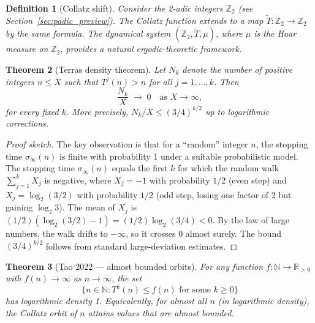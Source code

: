 \documentclass[12pt,a4paper]{article}
\newtheorem{theorem}{Theorem}[section]
\newtheorem{definition}[theorem]{Definition}
\begin{document}
\begin{definition}[Collatz shift]\label{def:shift}
Consider the 2-adic integers $\mathbb{Z}_2$ (see Section~\ref{sec:padic_preview}).
The Collatz function extends to a map
$\tilde{T}\colon \mathbb{Z}_2 \to \mathbb{Z}_2$
by the same formula. The dynamical system $(\mathbb{Z}_2, \tilde{T}, \mu)$, where
$\mu$ is the Haar measure on $\mathbb{Z}_2$, provides a natural ergodic-theoretic
framework.
\end{definition}

\begin{theorem}[Terras density theorem]\label{thm:terras}
Let $N_k$ denote the number of positive integers $n \leq X$ such that $T^j(n) > n$
for all $j = 1, \ldots, k$. Then
\[
  \frac{N_k}{X} \;\longrightarrow\; 0 \quad \text{as } X \to \infty,
\]
for every fixed $k$. More precisely, $N_k/X \leq (3/4)^{k/2}$ up to logarithmic corrections.
\end{theorem}

\begin{proof}[Proof sketch]
The key observation is that for a ``random'' integer $n$, the stopping time $\sigma_\infty(n)$
is finite with probability 1 under a suitable probabilistic model. The stopping time
$\sigma_\infty(n)$ equals the first $k$ for which the random walk $\sum_{j=1}^k X_j$ is
negative, where $X_j = -1$ with probability $1/2$ (even step) and $X_j = \log_2(3/2)$
with probability $1/2$ (odd step, losing one factor of 2 but gaining $\log_2 3$).
The mean of $X_j$ is $(1/2)(\log_2(3/2) - 1) = (1/2)\log_2(3/4) < 0$.
By the law of large numbers, the walk drifts to $-\infty$, so it crosses 0 almost surely.
The bound $(3/4)^{k/2}$ follows from standard large-deviation estimates.
\end{proof}

\begin{theorem}[Tao 2022 — almost bounded orbits]\label{thm:tao}
For any function $f\colon \mathbb{N} \to \mathbb{R}_{>0}$ with $f(n) \to \infty$ as
$n \to \infty$, the set
\[
  \bigl\{ n \in \mathbb{N} : T^k(n) \leq f(n) \text{ for some } k \geq 0 \bigr\}
\]
has logarithmic density 1. Equivalently, for almost all $n$ (in logarithmic density),
the Collatz orbit of $n$ attains values that are almost bounded.
\end{theorem}
\end{document}
